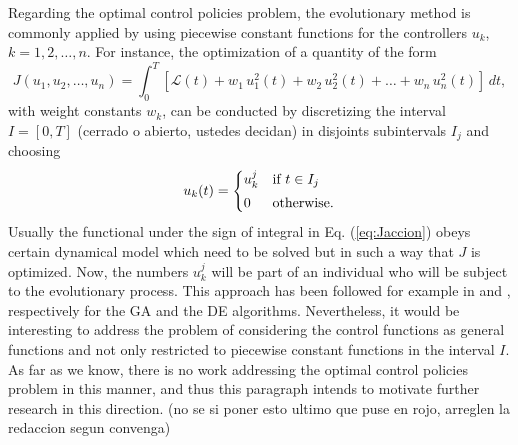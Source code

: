 Regarding the optimal control policies problem, the evolutionary 
method is commonly applied by using piecewise constant functions for the 
controllers $u_k$, $k=1,2,\dots,n$. For instance, the optimization of a
quantity of the form
\begin{equation}
J(u_1,u_2,\dots,u_n) = \int_0^T{\left[ \mathcal{L}(t) + w_1\,u_1^2(t) + 
w_2\,u_2^2(t)+\dots + w_n\,u_n^2(t) \right]\,dt},
\label{eq:Jaccion}
\end{equation}
with weight constants $w_k$, can be conducted by discretizing the 
interval $I = [0,T]$ {\color{red}(cerrado o abierto, ustedes decidan)} in 
disjoints subintervals $I_j$ and choosing  
\begin{equation}\label{DECrossover}
u_{k}(t) =
\begin{cases}
u^j_{k} & \text{if $t \in I_j$}
\vspace*{0.1cm}\\
0 & \text{otherwise.}
\end{cases}
\end{equation}
Usually the functional under the sign of integral in Eq. (\ref{eq:Jaccion})
obeys certain dynamical model which need to be solved but in such a way
that $J$ is optimized. Now, the numbers $u^j_{k}$ will be part of an 
individual who will be subject to the evolutionary process. This approach 
has been followed for example in \cite{Yan2008} and \cite{Jang2018}, 
respectively for the GA and the DE algorithms. {\color{red} Nevertheless,
it would be interesting to address the problem of considering the control
functions as general functions and not only restricted to piecewise constant
functions in the interval $I$. As far as we know, there is no work addressing 
the optimal control policies problem in this manner, and thus this paragraph
intends to motivate further research in this direction.} (no se si poner esto
ultimo que puse en rojo, arreglen la redaccion segun convenga)


